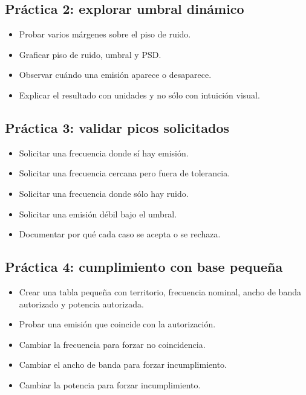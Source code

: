 \documentclass[11pt,a4paper]{article}
\begin{document}
\subsection*{Práctica 2: explorar umbral dinámico}

\begin{itemize}
  \item Probar varios márgenes sobre el piso de ruido.
  \item Graficar piso de ruido, umbral y PSD.
  \item Observar cuándo una emisión aparece o desaparece.
  \item Explicar el resultado con unidades y no sólo con intuición visual.
\end{itemize}

\subsection*{Práctica 3: validar picos solicitados}

\begin{itemize}
  \item Solicitar una frecuencia donde sí hay emisión.
  \item Solicitar una frecuencia cercana pero fuera de tolerancia.
  \item Solicitar una frecuencia donde sólo hay ruido.
  \item Solicitar una emisión débil bajo el umbral.
  \item Documentar por qué cada caso se acepta o se rechaza.
\end{itemize}

\subsection*{Práctica 4: cumplimiento con base pequeña}

\begin{itemize}
  \item Crear una tabla pequeña con territorio, frecuencia nominal, ancho de banda autorizado y potencia autorizada.
  \item Probar una emisión que coincide con la autorización.
  \item Cambiar la frecuencia para forzar no coincidencia.
  \item Cambiar el ancho de banda para forzar incumplimiento.
  \item Cambiar la potencia para forzar incumplimiento.
\end{itemize}
\end{document}
